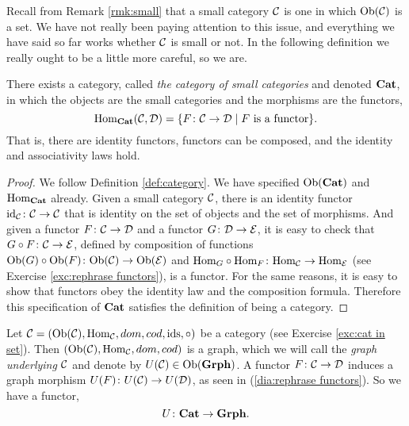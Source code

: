 \documentclass[CT4S-EN-RU]{subfiles}
\begin{document}

\subsubsection{}\label{sec:cat of cats}

Recall from Remark \ref{rmk:small} that a small category $\mathcal{C}$ is one in which $\textnormal{Ob}(\mathcal{C})$ is a set. We have not really been paying attention to this issue, and everything we have said so far works whether $\mathcal{C}$ is small or not. In the following definition we really ought to be a little more careful, so we are. 

\begin{proposition}

There exists a category, called {\em the category of small categories} and denoted ${\bf Cat}$, in which the objects are the small categories and the morphisms are the functors, $$\textnormal{Hom}_{\bf Cat}(\mathcal{C},\mathcal{D})=\{F\colon\mathcal{C}\rightarrow\mathcal{D}{\;|\;} F \textnormal{ is a functor}\}.$$ That is, there are identity functors, functors can be composed, and the identity and associativity laws hold.
 
\end{proposition}

\begin{proof}

We follow Definition \ref{def:category}. We have specified $\textnormal{Ob}({\bf Cat})$ and $\textnormal{Hom}_{\bf Cat}$ already. Given a small category $\mathcal{C}$, there is an identity functor $\textnormal{id}_\mathcal{C}\colon\mathcal{C}\rightarrow\mathcal{C}$ that is identity on the set of objects and the set of morphisms. And given a functor $F\colon\mathcal{C}\rightarrow\mathcal{D}$ and a functor $G\colon\mathcal{D}\rightarrow\mathcal{E}$, it is easy to check that $G\circ F\colon \mathcal{C}\rightarrow\mathcal{E}$, defined by composition of functions $\textnormal{Ob}(G)\circ\textnormal{Ob}(F)\colon\textnormal{Ob}(\mathcal{C})\rightarrow\textnormal{Ob}(\mathcal{E})$ and $\textnormal{Hom}_G\circ\textnormal{Hom}_F\colon\textnormal{Hom}_\mathcal{C}\rightarrow\textnormal{Hom}_\mathcal{E}$ (see Exercise \ref{exc:rephrase functors}), is a functor. For the same reasons, it is easy to show that functors obey the identity law and the composition formula. Therefore this specification of ${\bf Cat}$ satisfies the definition of being a category. 

\end{proof}

\begin{example}\label{ex:underlying graph}

Let $\mathcal{C}=(\textnormal{Ob}(\mathcal{C}),\textnormal{Hom}_\mathcal{C},dom,cod,\textnormal{ids},\circ)$ be a category (see Exercise \ref{exc:cat in set}). Then $(\textnormal{Ob}(\mathcal{C}),\textnormal{Hom}_\mathcal{C},dom,cod)$ is a graph, which we will call the {\em graph underlying $\mathcal{C}$} and denote by $U(\mathcal{C})\in\textnormal{Ob}({\bf Grph})$. A functor $F\colon\mathcal{C}\rightarrow\mathcal{D}$ induces a graph morphism $U(F)\colon U(\mathcal{C})\rightarrow U(\mathcal{D})$, as seen in (\ref{dia:rephrase functors}). So we have a functor, $$U\colon{\bf Cat}\rightarrow{\bf Grph}.$$

\end{example}
\end{document}
